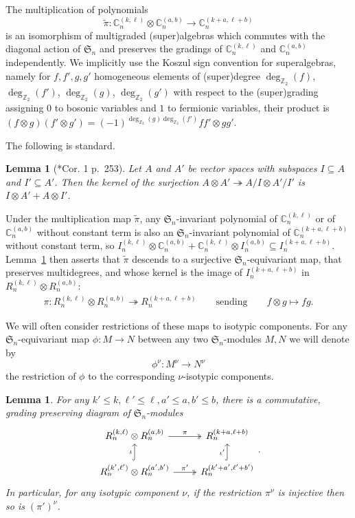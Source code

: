 \documentclass[11pt, reqno]{amsart}
\newtheorem{lemma}[theorem]{Lemma}
\theoremstyle{definition}
\theoremstyle{remark}
\numberwithin{equation}{section}
\newcommand{\0}{\emptyset}
\newcommand{\Z}{\mathbb{Z}}
\newcommand{\C}{\mathbb{C}}
\renewcommand{\S}{\mathfrak{S}}
\begin{document}
The multiplication of polynomials 
\[
    \tilde{\pi} :
    \C_n^{(k,\ell)} \otimes \C_n^{(a,b)}\to \C_n^{(k+a,\ell+b)}
\]
is an isomorphism of multigraded (super)algebras which commutes with the diagonal 
action of $\S_n$ and preserves the gradings of $\C_n^{(k,\ell)}$ and 
$\C_n^{(a,b)}$ independently. 
We implicitly use the Koszul sign convention for superalgebras, namely for $f, f', g, g'$ 
homogeneous elements of (super)degree 
$\deg_{\Z_2}(f)$, $\deg_{\Z_2}(f')$, $\deg_{\Z_2}(g)$, $\deg_{\Z_2}(g')$ 
with respect to the (super)grading assigning $0$ to bosonic variables and 
$1$ to fermionic variables, their product is 
$(f \otimes g)(f' \otimes g') = (-1)^{\deg_{\Z_2}(g)\deg_{\Z_2}(f')}ff' \otimes gg'$. 

The following is standard.
\begin{lemma}[\cite{BourbakiAlgebraI}*{Cor. 1 p.~253}]\label{lem:tensor-quotients}
    Let $A$ and $A'$ be vector spaces with subspaces $I \subseteq A$ and $I' \subseteq A'$. Then the kernel of the surjection $A \otimes A' \twoheadrightarrow A/I \otimes A'/I'$ is $I \otimes A' + A \otimes I'$.
\end{lemma}

Under the multiplication map $\tilde{\pi}$, any $\S_n$-invariant polynomial of $\C_n^{(k,\ell)}$ or of $\C_n^{(a,b)}$ without constant term is also an  $\S_n$-invariant polynomial of $\C_n^{(k+a,\ell+b)}$ without constant term, so $I_n^{(k,\ell)} \otimes \C_n^{(a,b)} + \C_n^{(k,\ell)} \otimes I_n^{(a,b)} \subseteq I_n^{(k+a,\ell+b)}$.
Lemma~\ref{lem:tensor-quotients} then asserts that $\tilde{\pi}$ descends to a surjective $\S_n$-equivariant map, that preserves multidegrees, and whose kernel is the image of $I_n^{(k+a,\ell+b)}$ in $R_n^{(k,\ell)} \otimes R_n^{(a,b)}$:
\begin{align}\label{eq:pi-map}
    \pi : 
    R_n^{(k,\ell)} 
    \otimes 
    R_n^{(a,b)} 
    \twoheadrightarrow 
    R_n^{(k+a,\ell+b)}
    \qquad \text{sending} \qquad
    f\otimes g \mapsto fg.
\end{align}

We will often consider restrictions of these maps to isotypic components. For any $\S_n$-equivariant map $\phi: M \to N$ between any two $\S_n$-modules $M,N$ we will denote by 
\[
\phi^{\nu}: M^{\nu} \to N^{\nu}
\]
the restriction of $\phi$ to the corresponding $\nu$-isotypic components.

\begin{lemma}
    \label{lem:tensor-commutative-diagram}
    For any $k'\leq k, \ell'\leq \ell, a'\leq a, b'\leq b$, 
    there is a commutative, grading preserving diagram of $\S_n$-modules 
    \[
    \begin{tikzcd}
        R_n^{(k,\ell)} \otimes R_n^{(a,b)} \arrow[r, "\pi", two heads] & 
        R_n^{(k+a, \ell+b)} \\ 
        R_n^{(k',\ell')} \otimes R_n^{(a',b')} \arrow[r, "\pi'", two heads] \arrow[u, "\iota", hook] & 
        R_n^{(k'+a', \ell'+b')}\arrow[u, "\iota'", hook] 
    \end{tikzcd}.
    \]
    In particular, for any isotypic component $\nu$, if the restriction 
$\pi^{\nu}$ is injective then so is $(\pi')^{\nu}$. 
\end{lemma}
\end{document}
